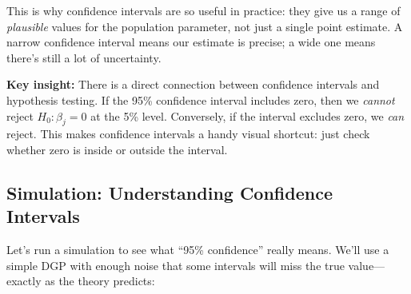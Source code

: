 \documentclass[
  letterpaper,
  DIV=11,
  numbers=noendperiod]{scrreprt}
\begin{document}
This is why confidence intervals are so useful in practice: they give us
a range of \emph{plausible} values for the population parameter, not
just a single point estimate. A narrow confidence interval means our
estimate is precise; a wide one means there's still a lot of
uncertainty.

\textbf{Key insight:} There is a direct connection between confidence
intervals and hypothesis testing. If the 95\% confidence interval
includes zero, then we \emph{cannot} reject \(H_0: \beta_j = 0\) at the
5\% level. Conversely, if the interval excludes zero, we \emph{can}
reject. This makes confidence intervals a handy visual shortcut: just
check whether zero is inside or outside the interval.

\subsection{Simulation: Understanding Confidence
Intervals}\label{simulation-understanding-confidence-intervals}

Let's run a simulation to see what ``95\% confidence'' really means.
We'll use a simple DGP with enough noise that some intervals will miss
the true value---exactly as the theory predicts:
\end{document}

